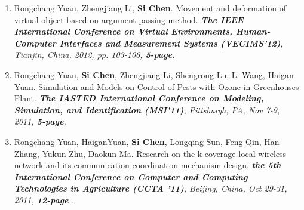 \documentclass[letter]{article}
\newcommand{\publication}[4]{\item #1. #2. \emph{#3.} #4}
\begin{document}
\begin{description}
\begin{enumerate}[{C-}1.]
\publication{Rongchang Yuan, Zhengjiang Li, \textbf{Si Chen}} {Movement and deformation of virtual object based on argument passing method}  {\textbf{The IEEE International Conference on Virtual Environments, Human-Computer Interfaces and Measurement Systems (VECIMS'12)}, Tianjin, China, 2012, pp. 103-106, \textbf{5-page}} 

\publication{Rongchang Yuan, \textbf{Si Chen}, Zhengjiang Li, Shengrong Lu, Li Wang, Haigan Yuan} {Simulation and Models on Control of Pests with Ozone in Greenhouses Plant}  {\textbf{The IASTED International Conference on Modeling, Simulation, and Identification (MSI'11)}, Pittsburgh, PA, Nov 7-9, 2011, \textbf{5-page}} 

\publication{Rongchang Yuan, HaiganYuan, \textbf{Si Chen}, Longqing Sun, Feng Qin, Han Zhang, Yukun Zhu, Daokun Ma} {Research on the k-coverage local wireless network and its communication coordination mechanism design}  {\textbf{the 5th International Conference on Computer and Computing Technologies in Agriculture (CCTA '11)}, Beijing, China, Oct 29-31, 2011, \textbf{12-page }} 






\end{enumerate}
\end{description}
\end{document}
